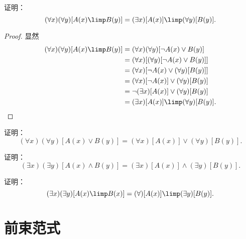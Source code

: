 \begin{example}
证明：\begin{equation}
	(\forall x)(\forall y)[A(x) \limp B(y)]
	= (\exists x)[A(x)] \limp (\forall y)[B(y)].
\end{equation}
\begin{proof}
显然\begin{align*}
	(\forall x)(\forall y)[A(x) \limp B(y)]
	&= (\forall x)(\forall y)[\neg A(x) \lor B(y)] \\
	&= (\forall x)
		[
			(\forall y)
			[
				\neg A(x) \lor B(y)
			]
		] \\
	&= (\forall x)
		[
			\neg A(x)
			\lor
			(\forall y)[B(y)]
		] \\
	&= (\forall x)[\neg A(x)] \lor (\forall y)[B(y)] \\
	&= \neg(\exists x)[A(x)] \lor (\forall y)[B(y)] \\
	&= (\exists x)[A(x)] \limp (\forall y)[B(y)].
	\qedhere
\end{align*}
\end{proof}
\end{example}

\begin{example}
证明：\begin{equation}
	(\forall x)(\forall y)[A(x) \lor B(y)]
	= (\forall x)[A(x)] \lor (\forall y)[B(y)].
\end{equation}
\end{example}

\begin{example}
证明：\begin{equation}
	(\exists x)(\exists y)[A(x) \land B(y)]
	= (\exists x)[A(x)] \land (\exists y)[B(y)].
\end{equation}
\end{example}

\begin{example}
证明：\begin{equation}
	(\exists x)(\exists y)[A(x) \limp B(x)]
	= (\forall)[A(x)] \limp (\exists y)[B(y)].
\end{equation}
\end{example}

\section{前束范式}
